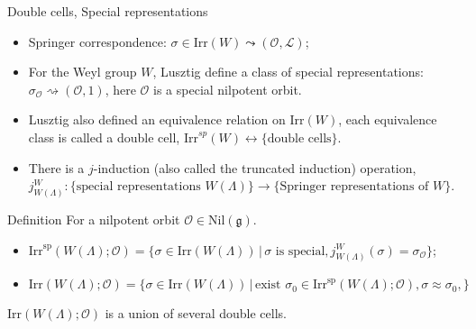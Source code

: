 \documentclass[fleqn,xcolor=dvipsnames]{beamer}
\newcommand{\CL}{{\mathcal {L}}}
\newcommand{\CO}{{\mathcal {O}}}
\newcommand{\fg}{\mathfrak{g}}
\newcommand{\Irr}{{\mathrm{Irr}}}
\newcommand{\Nil}{{\mathrm{Nil}}}
\newcommand{\set}[2]{\{#1\,|\,#2\}}
\begin{document}
\begin{frame}{Double cells, Special representations}
  
\begin{itemize}
  \item Springer correspondence: $\sigma \in \Irr(W) \leadsto (\CO,\CL)$;
  \pause\item For the Weyl group $W$, Lusztig define a class of \alert{special representations}:  $\sigma_{\CO} \rightsquigarrow (\CO,1)$, here $\CO$ is a \alert{special nilpotent orbit}.
  \pause\item Lusztig also defined an equivalence relation on $\Irr(W)$, each equivalence class is called a \alert{double cell}, $\Irr^{sp}(W) \leftrightarrow \{ \textrm{double cells} \}$.
  \pause\item There is a \alert{$j$-induction} (also called the truncated induction) operation, $j_{W(\Lambda)}^{W}: \{ \textrm{special representations $W(\Lambda)$}\} \to \{\textrm{Springer representations of $W$} \}$.
\end{itemize}

\end{frame}





\begin{frame}
  \begin{block}{Definition}
    For a nilpotent orbit $\CO \in \Nil(\fg)$.
    \begin{itemize}
      \item $\Irr^{\mathrm{sp}}(W(\Lambda);\CO) = \set{\sigma \in \Irr(W(\Lambda))}{\textrm{$\sigma$ is special}, j_{W(\Lambda)}^{W}(\sigma) = \sigma_{\CO}}$;
      \pause\item $\Irr(W(\Lambda);\CO) = \set{\sigma \in \Irr(W(\Lambda))}{\textrm{exist $\sigma_{0} \in \Irr^{\mathrm{sp}}(W(\Lambda);\CO)$}, \sigma \approx \sigma_{0}, }$
    \end{itemize}
  \end{block}
  \pause$\Irr(W(\Lambda);\CO)$ is a union of several double cells.
\end{frame}
\end{document}
